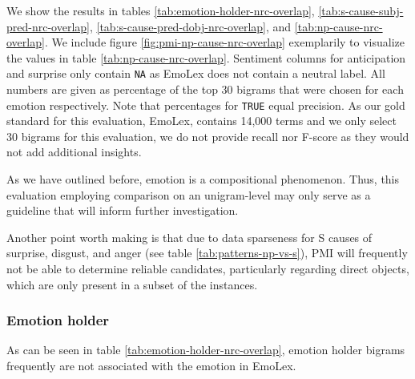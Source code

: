 We show the results in tables \ref{tab:emotion-holder-nrc-overlap}, \ref{tab:s-cause-subj-pred-nrc-overlap}, \ref{tab:s-cause-pred-dobj-nrc-overlap}, and \ref{tab:np-cause-nrc-overlap}. We include figure \ref{fig:pmi-np-cause-nrc-overlap} exemplarily to visualize the values in table \ref{tab:np-cause-nrc-overlap}. Sentiment columns for anticipation and surprise only contain \texttt{NA} as EmoLex does not contain a neutral label. All numbers are given as percentage of the top 30 bigrams that were chosen for each emotion respectively. Note that percentages for \texttt{TRUE} equal precision. As our gold standard for this evaluation, EmoLex, contains 14,000 terms and we only select 30 bigrams for this evaluation, we do not provide recall nor F-score as they would not add additional insights.

As we have outlined before, emotion is a compositional phenomenon. Thus, this evaluation employing comparison on an unigram-level may only serve as a guideline that will inform further investigation.

Another point worth making is that due to data sparseness for S causes of surprise, disgust, and anger (see table \ref{tab:patterns-np-vs-s}), PMI will frequently not be able to determine reliable candidates, particularly regarding direct objects, which are only present in a subset of the instances.

\subsubsection{Emotion holder}

As can be seen in table \ref{tab:emotion-holder-nrc-overlap}, emotion holder bigrams frequently are not associated with the emotion in EmoLex.

